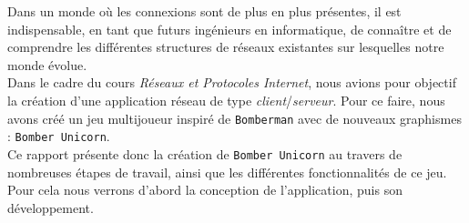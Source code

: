 Dans un monde où les connexions sont de plus en plus présentes, il est indispensable, en tant que futurs ingénieurs en informatique, de connaître et de comprendre les différentes structures de réseaux existantes sur lesquelles notre monde évolue.\\


Dans le cadre du cours \textit{Réseaux et Protocoles Internet}, nous avions pour objectif la création d'une application réseau de type \textit{client}/\textit{serveur}. Pour ce faire, nous avons créé un jeu multijoueur inspiré de \texttt{Bomberman} avec de nouveaux graphismes : \texttt{Bomber Unicorn}.\\


Ce rapport présente donc la création de \texttt{Bomber Unicorn} au travers de nombreuses étapes de travail, ainsi que les différentes fonctionnalités de ce jeu. Pour cela nous verrons d'abord la conception de l'application, puis son développement.
